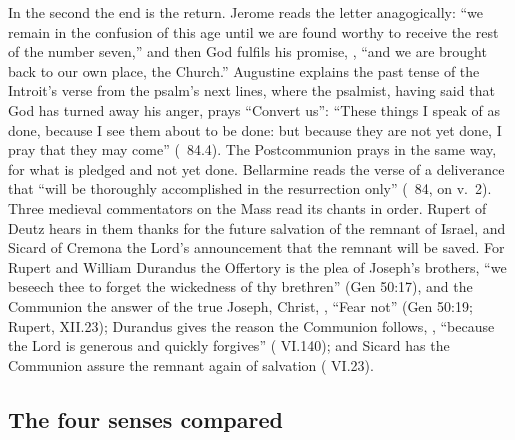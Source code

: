 In the second the end is the return. Jerome reads the letter anagogically:
``we remain in the confusion of this age until we are found worthy to receive
the rest of the number seven,'' and then God fulfils his promise, , ``and we are brought back to our own
place, the Church.'' Augustine explains the past tense of the Introit's verse
from the psalm's next lines, where the psalmist, having said that God has
turned away his anger, prays ``Convert us'': ``These things I speak of as
done, because I see them about to be done: but because they are not yet done,
I pray that they may come'' (\ 84.4). The Postcommunion
prays in the same way, for what is pledged and not yet done. Bellarmine
reads the verse of a deliverance that ``will be thoroughly accomplished in the
resurrection only'' (\ 84, on v.~2). Three medieval
commentators on the Mass read its chants in order. Rupert of Deutz hears in
them thanks for the future salvation of the remnant of Israel, and Sicard of
Cremona the Lord's announcement that the remnant will be saved. For Rupert and
William Durandus the Offertory is the plea of Joseph's brothers, ``we
beseech thee to forget the wickedness of thy brethren'' (Gen 50:17), and the
Communion the answer of the true Joseph, Christ, , ``Fear
not'' (Gen 50:19; Rupert,  XII.23); Durandus gives the
reason the Communion follows, , ``because the Lord is generous and quickly forgives''
( VI.140); and Sicard has the Communion assure the remnant
again of salvation ( VI.23).

\subsection{The four senses compared}

